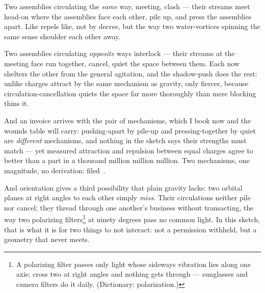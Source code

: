 \documentclass[fontsize=11pt,paper=a4,pagesize=auto,parskip=half-]{scrbook}
\begin{document}
Two assemblies circulating the \emph{same} way, meeting, clash --- their streams meet head-on where the assemblies face each other, pile up, and press the assemblies apart. Like repels like, not by decree, but the way two water-vortices spinning the same sense shoulder each other away.

Two assemblies circulating \emph{opposite} ways interlock --- their streams at the meeting face run together, cancel, quiet the space between them. Each now shelters the other from the general agitation, and the shadow-push does the rest: unlike charges attract by the same mechanism as gravity, only fiercer, because circulation-cancellation quiets the space far more thoroughly than mere blocking thins it.

And an invoice arrives with the pair of mechanisms, which I book now and the wounds table will carry: pushing-apart by pile-up and pressing-together by quiet are \emph{different} mechanisms, and nothing in the sketch says their strengths must match --- yet measured attraction and repulsion between equal charges agree to better than a part in a thousand million million million. Two mechanisms, one magnitude, no derivation: filed~\cite{bressi2011}.

And orientation gives a third possibility that plain gravity lacks: two orbital planes at right angles to each other simply \emph{miss}. Their circulations neither pile nor cancel; they thread through one another's business without transacting, the way two polarizing filters\footnote{A polarizing filter passes only light whose sideways vibration lies along one axis; cross two at right angles and nothing gets through --- sunglasses and camera filters do it daily. (Dictionary: polarization.)} at ninety degrees pass no common light. In this sketch, that is what it is for two things to not interact: not a permission withheld, but a geometry that never meets.
\end{document}
